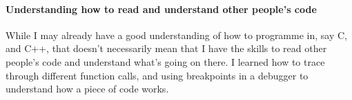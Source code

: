             \paragraph{Understanding how to read and understand other people's code}
            While I may already have a good understanding of how to programme in, say C, and C++, that doesn't necessarily mean that I have the skills to read other people's code and understand what's going on there. I learned how to trace through different function calls, and using breakpoints in a debugger to understand how a piece of code works.
        